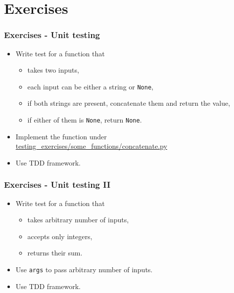 \documentclass[9pt,xcolor=dvipsnames]{beamer}
\begin{document}
\section{Exercises}
\begin{frame}
  \frametitle{Exercises - Unit testing}
  \begin{itemize}
  \item Write test for a function that
    \begin{itemize}
    \item takes two inputs,
    \item each input can be either a string or {\tt None},
    \item if both strings are present, concatenate them and return
      the value,
    \item if either of them is {\tt None}, return {\tt None}. 
    \end{itemize}
  \item Implement the function under
    \url{testing_exercises/some_functions/concatenate.py}
  \item Use TDD framework.
  \end{itemize}
\end{frame}

\begin{frame}
  \frametitle{Exercises - Unit testing II}
  \begin{itemize}
  \item Write test for a function that
    \begin{itemize}
    \item takes arbitrary number of inputs,
    \item accepts only integers,
    \item returns their sum.
    \end{itemize}
  \item Use {\tt *args} to pass arbitrary number of inputs.
    \item Use TDD framework.
  \end{itemize}
\end{frame}
\end{document}
